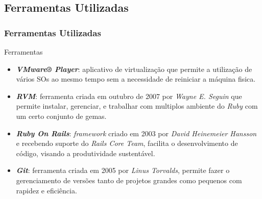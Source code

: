 \subsection{Ferramentas Utilizadas}
\begin{frame}
 \frametitle{Ferramentas Utilizadas}

 \begin{block}{Ferramentas}
  \begin{itemize}

   \item \emph{\textbf{VMware® Player}}: aplicativo de virtualização que permite a utilização de vários SOs ao
  mesmo tempo sem a necessidade de reiniciar a máquina fisica.

   \item \emph{\textbf{RVM}}: ferramenta criada em outubro de 2007 por \emph{Wayne E. Seguin} que permite instalar,
  gerenciar, e trabalhar com multiplos ambiente do \emph{Ruby} com um certo conjunto de gemas.

   \item \emph{\textbf{Ruby On Rails}}: \emph{framework} criado em 2003 por \emph{David Heinemeier Hansson} e
  recebendo suporte do \emph{Rails Core Team}, facilita o desenvolvimento de código, visando a produtividade
  sustentável.

   \item \emph{\textbf{Git}}: ferramenta criada em 2005 por \emph{Linus Torvalds}, permite fazer o gerenciamento
  de versões tanto de projetos grandes como pequenos com rapidez e eficiência.

  \end{itemize}

 \end{block}

\end{frame}


